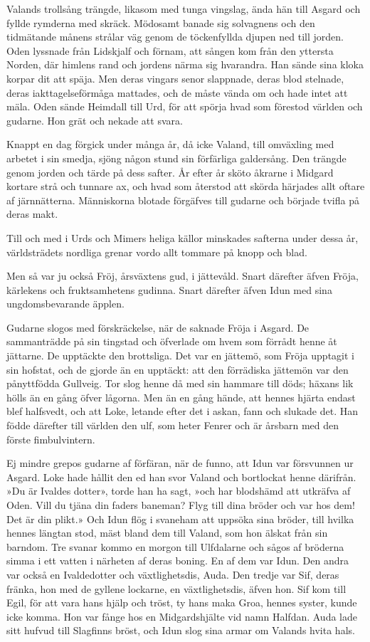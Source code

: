 Valands trollsång trängde, likasom med tunga vingslag, ända hän till
Asgard och fyllde rymderna med skräck. Mödosamt banade sig solvagnens
och den tidmätande månens strålar väg genom de töckenfyllda djupen ned
till jorden. Oden lyssnade från Lidskjalf och förnam, att sången kom
från den yttersta Norden, där himlens rand och jordens närma sig
hvarandra. Han sände sina kloka korpar dit att späja. Men deras vingars
senor slappnade, deras blod stelnade, deras iakttagelseförmåga mattades,
och de måste vända om och hade intet att mäla. Oden sände Heimdall till
Urd, för att spörja hvad som förestod världen och gudarne. Hon grät och
nekade att svara.

Knappt en dag förgick under många år, då icke Valand, till omväxling med
arbetet i sin smedja, sjöng någon stund sin förfärliga galdersång. Den
trängde genom jorden och tärde på dess safter. År efter år sköto åkrarne
i Midgard kortare strå och tunnare ax, och hvad som återstod att skörda
härjades allt oftare af järnnätterna. Människorna blotade förgäfves till
gudarne och började tvifla på deras makt.

Till och med i Urds och Mimers heliga källor minskades safterna under
dessa år, världsträdets nordliga grenar vordo allt tommare på knopp och
blad.

Men så var ju också Fröj, årsväxtens gud, i jättevåld. Snart därefter
äfven Fröja, kärlekens och fruktsamhetens gudinna. Snart därefter äfven
Idun med sina ungdomsbevarande äpplen.

Gudarne slogos med förskräckelse, när de saknade Fröja i Asgard. De
sammanträdde på sin tingstad och öfverlade om hvem som förrådt henne åt
jättarne. De upptäckte den brottsliga. Det var en jättemö, som Fröja
upptagit i sin hofstat, och de gjorde än en upptäckt: att den förrädiska
jättemön var den pånyttfödda Gullveig. Tor slog henne då med
sin hammare till döds; häxans lik hölls än en gång öfver lågorna. Men än
en gång hände, att hennes hjärta endast blef halfsvedt, och att Loke,
letande efter det i askan, fann och slukade det. Han födde därefter till
världen den ulf, som heter Fenrer och är årsbarn med den förste
fimbulvintern.

Ej mindre grepos gudarne af förfäran, när de funno, att Idun var
försvunnen ur Asgard. Loke hade hållit den ed han svor Valand och
bortlockat henne därifrån. »Du är Ivaldes dotter», torde han ha sagt,
»och har blodshämd att utkräfva af Oden. Vill du tjäna din faders
baneman? Flyg till dina bröder och var hos dem! Det är din plikt.» Och
Idun flög i svaneham att uppsöka sina bröder, till hvilka hennes längtan
stod, mäst bland dem till Valand, som hon älskat från sin barndom. Tre
svanar kommo en morgon till Ulfdalarne och sågos af bröderna simma i ett
vatten i närheten af deras boning. En af dem var Idun. Den andra var
också en Ivaldedotter och växtlighetsdis, Auda. Den tredje var Sif,
deras fränka, hon med de gyllene lockarne, en växtlighetsdis, äfven hon.
Sif kom till Egil, för att vara hans hjälp och tröst, ty hans maka Groa,
hennes syster, kunde icke komma. Hon var fånge hos en Midgardshjälte vid
namn Halfdan. Auda lade sitt hufvud till Slagfinns bröst, och Idun slog
sina armar om Valands hvita hals.

